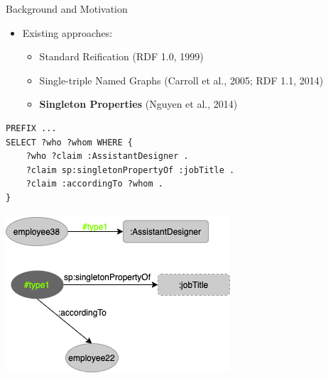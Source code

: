 \documentclass[aspectratio=169]{beamer}
\begin{document}
\begin{frame}[fragile]{Background and Motivation}
    \begin{itemize}
        \item Existing approaches:
            \begin{itemize}
                \item Standard Reification (RDF 1.0, 1999)
                \item Single-triple Named Graphs (Carroll et al., 2005; RDF 1.1, 2014)
                \item \textbf{Singleton Properties} (Nguyen et al., 2014)
            \end{itemize}
    \end{itemize}
    
    \begin{minipage}{0.56\textwidth}
\begin{lstlisting}[language=SPARQL]
PREFIX ...
SELECT ?who ?whom WHERE {
    ?who ?claim :AssistantDesigner .
    ?claim sp:singletonPropertyOf :jobTitle .
    ?claim :accordingTo ?whom .
}
\end{lstlisting}
\end{minipage}
\begin{minipage}{0.43\textwidth}
\centering
	\includegraphics[scale=0.5]{images/Example-2-SingletonProperties.png}
\end{minipage}
\end{frame}
\end{document}
